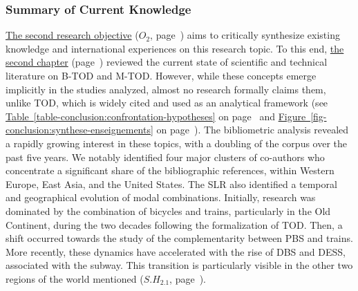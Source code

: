 \begin{refsegment}


\subsubsection*{Summary of Current Knowledge
    \label{conclusion-generale:principaux-apports-chapitre2}
    }

\hyperref[objectif-2]{The second research objective} (\(O_2\), page~\pageref{objectif-2}) aims to critically synthesize existing knowledge and international experiences on this research topic. To this end, \hyperref[chap2:titre]{the second chapter} (page~\pageref{chap2:titre}) reviewed the current state of scientific and technical literature on \acrshort{B-TOD} and \acrshort{M-TOD}. However, while these concepts emerge implicitly in the studies analyzed, almost no research formally claims them, unlike \acrshort{TOD}, which is widely cited and used as an analytical framework (see \hyperref[table-conclusion:confrontation-hypotheses]{Table~\ref{table-conclusion:confrontation-hypotheses}} on page~\pageref{table-conclusion:confrontation-hypotheses} and \hyperref[fig-conclusion:synthese-enseignements]{Figure~\ref{fig-conclusion:synthese-enseignements}} on page~\pageref{fig-conclusion:synthese-enseignements}). The bibliometric analysis revealed a rapidly growing interest in these topics, with a doubling of the corpus over the past five years. We notably identified four major clusters of co-authors who concentrate a significant share of the bibliographic references, within Western Europe, East Asia, and the United States. The \acrfull{SLR} also identified a temporal and geographical evolution of modal combinations. Initially, research was dominated by the combination of bicycles and trains, particularly in the Old Continent, during the two decades following the formalization of \acrshort{TOD}. Then, a shift occurred towards the study of the complementarity between \acrfull{PBS} and trains. More recently, these dynamics have accelerated with the rise of \acrfull{DBS} and \acrfull{DESS}, associated with the subway. This transition is particularly visible in the other two regions of the world mentioned (\hyperref[sous-hypothese-2.1]{\(S.H_{2.1}\)}, page~\pageref{sous-hypothese-2.1}).%


\end{refsegment}
